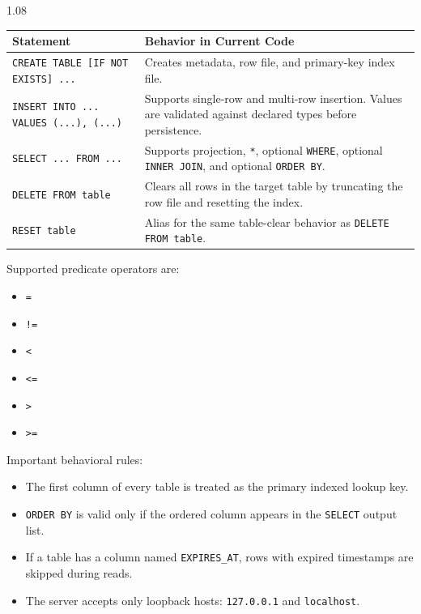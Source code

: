 \documentclass[11pt,a4paper]{article}
\begin{document}
\begin{spacing}{1.08}
\begin{longtable}{|>{\raggedright\arraybackslash}p{}|>{\raggedright\arraybackslash}p{}|}
\hline
\textbf{Statement} & \textbf{Behavior in Current Code} \\
\hline
\texttt{CREATE TABLE [IF NOT EXISTS] ...} & Creates metadata, row file, and primary-key index file. \\
\hline
\texttt{INSERT INTO ... VALUES (...), (...)} & Supports single-row and multi-row insertion. Values are validated against declared types before persistence. \\
\hline
\texttt{SELECT ... FROM ...} & Supports projection, \texttt{*}, optional \texttt{WHERE}, optional \texttt{INNER JOIN}, and optional \texttt{ORDER BY}. \\
\hline
\texttt{DELETE FROM table} & Clears all rows in the target table by truncating the row file and resetting the index. \\
\hline
\texttt{RESET table} & Alias for the same table-clear behavior as \texttt{DELETE FROM table}. \\
\hline
\end{longtable}

Supported predicate operators are:

\begin{itemize}
    \item \texttt{=}
    \item \texttt{!=}
    \item \texttt{<}
    \item \texttt{<=}
    \item \texttt{>}
    \item \texttt{>=}
\end{itemize}

Important behavioral rules:

\begin{itemize}
    \item The first column of every table is treated as the primary indexed lookup key.
    \item \texttt{ORDER BY} is valid only if the ordered column appears in the \texttt{SELECT} output list.
    \item If a table has a column named \texttt{EXPIRES\_AT}, rows with expired timestamps are skipped during reads.
    \item The server accepts only loopback hosts: \texttt{127.0.0.1} and \texttt{localhost}.
\end{itemize}


\end{spacing}
\end{document}

